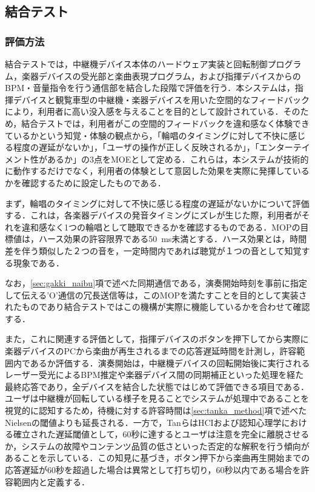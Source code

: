 \FloatBarrier

\subsection{結合テスト}
\subsubsection{評価方法}
\label{sec:ketsugo_method}

結合テストでは，中継機デバイス本体のハードウェア実装と回転制御プログラム，楽器デバイスの受光部と楽曲表現プログラム，および指揮デバイスからのBPM・音量指令を行う通信部を結合した段階で評価を行う．本システムは，指揮デバイスと観覧車型の中継機・楽器デバイスを用いた空間的なフィードバックにより，利用者に高い没入感を与えることを目的として設計されている．そのため，結合テストでは，利用者がこの空間的フィードバックを違和感なく体験できているかという知覚・体験の観点から，「輪唱のタイミングに対して不快に感じる程度の遅延がないか」，「ユーザの操作が正しく反映されるか」，「エンターテイメント性があるか」の3点をMOEとして定める．これらは，本システムが技術的に動作するだけでなく，利用者の体験として意図した効果を実際に発揮しているかを確認するために設定したものである．

まず，輪唱のタイミングに対して不快に感じる程度の遅延がないかについて評価する．これは，各楽器デバイスの発音タイミングにズレが生じた際，利用者がそれを違和感なく1つの輪唱として聴取できるかを確認するものである．MOPの目標値は，ハース効果の許容限界である\SI{50}{ms}未満とする．ハース効果とは，時間差を伴う類似した２つの音を，一定時間内であれば聴覚が１つの音として知覚する現象である\cite{haas1951}．

なお，\ref{sec:gakki_naibu}項で述べた同期通信である，演奏開始時刻を事前に指定して伝える'O'通信の冗長送信等は，このMOPを満たすことを目的として実装されたものであり結合テストではこの機構が実際に機能しているかを合わせて確認する．

また，これに関連する評価として，指揮デバイスのボタンを押下してから実際に楽器デバイスのPCから楽曲が再生されるまでの応答遅延時間を計測し，許容範囲内であるか評価する．演奏開始は，中継機デバイスの回転開始後に実行されるレーザー受光によるBPM推定や楽器デバイス間の同期補正といった処理を経た最終応答であり，全デバイスを結合した状態ではじめて評価できる項目である．ユーザは中継機が回転している様子を見ることでシステムが処理中であることを視覚的に認知するため，待機に対する許容時間は\ref{sec:tanka_method}項で述べたNielsenの閾値よりも延長される．一方で，TanらはHCIおよび認知心理学における確立された遅延閾値として，60秒に達するとユーザは注意を完全に離脱させるか，システムの故障やコンテンツ品質の低さといった否定的な解釈を行う傾向があることを示している\cite{tan2026}．この知見に基づき，ボタン押下から楽曲再生開始までの応答遅延が60秒を超過した場合は異常として打ち切り，60秒以内である場合を許容範囲内と定義する．

